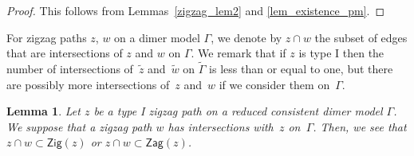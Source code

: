 \documentclass[pdftex]{sigma}%
\numberwithin{equation}{section}
\numberwithin{figure}{section}
\numberwithin{table}{section}
\newtheorem{Lemma}[Theorem]{Lemma}
\newcommand{\Zig}{\mathsf{Zig}}
\newcommand{\Zag}{\mathsf{Zag}}
\begin{document}
\begin{proof}
This follows from Lemmas~\ref{zigzag_lem2} and \ref{lem_existence_pm}.
\end{proof}

For zigzag paths $z$, $w$ on a dimer model $\Gamma$, we denote by $z\cap w$ the subset of edges that are intersections of $z$ and $w$ on $\Gamma$.
We remark that if $z$ is type I then the number of intersections of~$\widetilde{z}$ and~$\widetilde{w}$ on $\widetilde{\Gamma}$ is less than or equal to one, but there are possibly more intersections of~$z$ and~$w$ if we consider them on~$\Gamma$.

\begin{Lemma}\label{intersect_zigorzag}
Let $z$ be a type I zigzag path on a reduced consistent dimer model $\Gamma$.
We suppose that a zigzag path $w$ has intersections with~$z$ on~$\Gamma$.
Then, we see that $z\cap w\subset \Zig(z)$ or $z\cap w\subset \Zag(z)$.
\end{Lemma}
\end{document}

